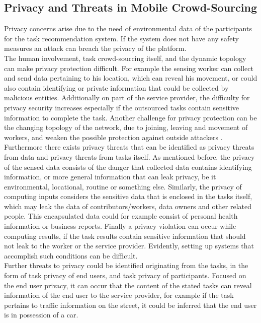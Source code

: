 \documentclass[a4paper,12pt]{report}
\begin{document}
		\subsection{Privacy and Threats in Mobile Crowd-Sourcing} \label{PrivacyMCS}
		\startsubsection
			Privacy concerns arise due to the need of environmental data of the participants for the task recommendation system. 
			If the system does not have any safety measures an attack can breach the privacy of the platform. \\
			The human involvement, task crowd-sourcing itself, and the dynamic topology can make privacy protection difficult.
			For example the sensing worker can collect and send data pertaining to his location, which can reveal his movement, or could also contain identifying or private information that could be collected by malicious entities. 
			Additionally on part of the service provider, the difficulty for privacy security increases especially if the outsourced tasks contain sensitive information to complete the task. 
			Another challenge for privacy protection can be the changing topology of the network, due to joining, leaving and movement of workers, and weaken the possible protection against outside attackers \cite{SecPriMobCSM}.\\
			Furthermore there exists privacy threats that can be identified as privacy threats from data and privacy threats from tasks itself. 
			As mentioned before, the privacy of the sensed data consists of the danger that collected data contains identifying information, or more general information that can leak privacy, be it environmental, locational, routine or something else. 
			Similarly, the privacy of computing inputs considers the sensitive data that is enclosed in the tasks itself, which may leak the data of contributors/workers, data owners and other related people. 
			This encapsulated data could for example consist of personal health information or business reports. 
			Finally a privacy violation can occur while computing results, if the task results contain sensitive information that should not leak to the worker or the service provider. 
			Evidently, setting up systems that accomplish such conditions can be difficult.\\
			Further threats to privacy could be identified originating from the tasks, in the form of task privacy of end users, and task privacy of participants. 
			Focused on the end user privacy, it can occur that the content of the stated tasks can reveal information of the end user to the service provider, for example if the task pertains to traffic information on the street, it could be inferred that the end user is in possession of a car. 
\end{document}
